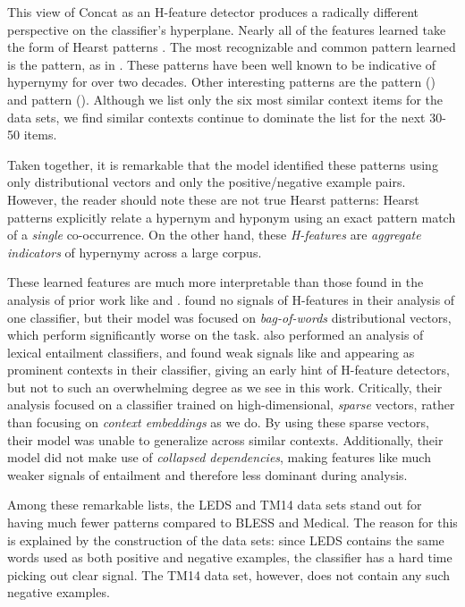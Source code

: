 This view of Concat as an H-feature detector produces a radically different
perspective on the classifier's hyperplane. Nearly all of the features learned
take the form of Hearst patterns \cite{hearst:1992:coling,snow:2004:nips}.  The
most recognizable and common pattern learned is the  pattern, as
in . These patterns have been well known to be
indicative of hypernymy for over two decades. Other interesting patterns are
the  pattern () and 
pattern (). Although we list only the six most similar
context items for the data sets, we find similar contexts continue to dominate
the list for the next 30-50 items.

Taken together, it is remarkable that the model identified these patterns using
only distributional vectors and only the positive/negative example pairs.
However, the reader should note these are not true Hearst patterns: Hearst
patterns explicitly relate a hypernym and hyponym using an exact pattern match
of a {\em single} co-occurrence. On the other hand, these {\em H-features} are
{\em aggregate indicators} of hypernymy across a large corpus.

These learned features are much more interpretable than those found in the
analysis of prior work like  and
.  found no signals of
H-features in their analysis of one classifier, but their model was focused on
{\em bag-of-words} distributional vectors, which perform significantly worse on
the task.   also performed an analysis of lexical
entailment classifiers, and found weak signals like  and 
appearing as prominent contexts in their classifier, giving an early hint of
H-feature detectors, but not to such an overwhelming degree as we see in this
work.  Critically, their analysis focused on a classifier trained on
high-dimensional, {\em sparse} vectors, rather than focusing on {\em context
embeddings} as we do.  By using these sparse vectors, their model was unable
to generalize across similar contexts. Additionally, their model did not make
use of {\em collapsed dependencies}, making features like  much
weaker signals of entailment and therefore less dominant during analysis.

Among these remarkable lists, the LEDS and TM14 data sets stand out for having
much fewer  patterns compared to BLESS and Medical. The reason
for this is explained by the construction of the data sets: since LEDS
contains the same words used as both positive and negative examples, the
classifier has a hard time picking out clear signal. The TM14 data set, however,
does not contain any such negative examples.

